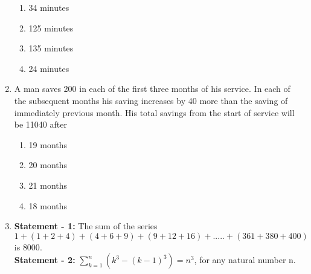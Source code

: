 \begin{enumerate}[label=\arabic*.,ref=\thesubsection.\theenumi]
\begin{enumerate}
\item 34 minutes
\item 125 minutes
\item 135 minutes
\item 24 minutes
\end{enumerate}
\item A man saves 200 in each of the first three months of his service. In each of the subsequent months his saving increases by 40 more than the saving of immediately previous month. His total savings from the start of service will be 11040 after
\begin{enumerate}
\item 19 months
\item 20 months
\item 21 months
\item 18 months
\end{enumerate}
\item \textbf{Statement - 1:} The sum of the series $1+(1+2+4)+(4+6+9)+(9+12+16)+.....+(361+380+400)$ is $8000.$\\
	  \textbf{Statement - 2:} $\sum_{k=1}^{n}(k^3 -(k-1)^3)=n^3$, for any natural number n.


\end{enumerate}

